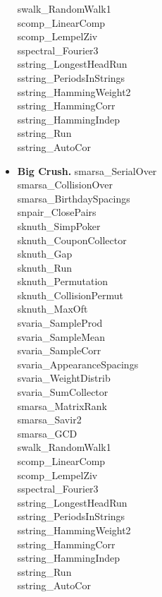 \begin{itemize}
 swalk\_RandomWalk1      \\ 
 scomp\_LinearComp     \\  
 scomp\_LempelZiv      \\ 
 sspectral\_Fourier3      \\ 
 sstring\_LongestHeadRun     \\  
 sstring\_PeriodsInStrings    \\   
 sstring\_HammingWeight2      \\ 
 sstring\_HammingCorr      \\ 
 sstring\_HammingIndep     \\  
 sstring\_Run      \\ 
 sstring\_AutoCor   \\ 
\item{\textbf{Big Crush.}} smarsa\_SerialOver\\ 
smarsa\_CollisionOver\\ 
smarsa\_BirthdaySpacings\\ 
snpair\_ClosePairs \\ 
sknuth\_SimpPoker\\ 
sknuth\_CouponCollector\\ 
sknuth\_Gap\\ 
sknuth\_Run\\ 
sknuth\_Permutation\\ 
sknuth\_CollisionPermut\\ 
sknuth\_MaxOft\\ 
svaria\_SampleProd\\ 
svaria\_SampleMean\\ 
svaria\_SampleCorr\\ 
svaria\_AppearanceSpacings\\ 
svaria\_WeightDistrib\\ 
svaria\_SumCollector\\ 
smarsa\_MatrixRank\\ 
smarsa\_Savir2\\ 
smarsa\_GCD\\ 
swalk\_RandomWalk1\\ 
scomp\_LinearComp\\ 
scomp\_LempelZiv\\ 
sspectral\_Fourier3\\ 
sstring\_LongestHeadRun\\ 
sstring\_PeriodsInStrings\\ 
sstring\_HammingWeight2\\ 
sstring\_HammingCorr\\ 
sstring\_HammingIndep\\ 
sstring\_Run\\ 
sstring\_AutoCor\\ 


\end{itemize}
